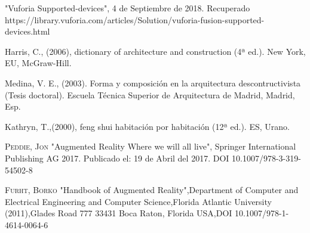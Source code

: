 \begin{thebibliography}{X}
	 "Vuforia Supported-devices", 4 de Septiembre de 2018. Recuperado
	https://library.vuforia.com/articles/Solution/vuforia-fusion-supported-devices.html
	
	 Harris, C., (2006), dictionary of architecture and construction (4ª ed.). New York, EU, McGraw-Hill.
	
	 Medina, V. E., (2003). Forma y composición en la arquitectura descontructivista (Tesis doctoral). Escuela Técnica Superior de Arquitectura de Madrid, Madrid, Esp.
	
	 Kathryn, T.,(2000), feng shui habitación por habitación (12ª ed.). ES, Urano.
	
	 \textsc{Peddie, Jon} "Augmented Reality Where we will all live", Springer International Publishing AG 2017. Publicado el: 19 de Abril del 2017. DOI 10.1007/978-3-319-54502-8 
	
	 \textsc{Furht, Borko} "Handbook of Augmented Reality",Department of Computer and Electrical Engineering and Computer Science,Florida Atlantic University (2011),Glades Road 777 33431 Boca Raton, Florida USA,DOI 10.1007/978-1-4614-0064-6
	
\end{thebibliography}
